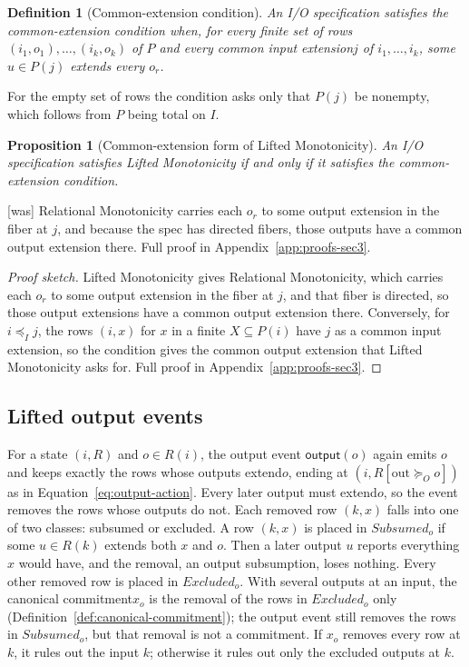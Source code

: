 \documentclass[sigconf]{cidr-2027}
\newtheorem{proposition}{Proposition}
\newtheorem{definition}{Definition}
\theoremstyle{remark}
\newcommand{\InputOrd}{\preceq_I}
\newcommand{\OutputGe}{\succeq_O}
\newcommand{\commitment}{commitment\xspace}
\newcommand{\indesc}{input extension\xspace} %
\newcommand{\outrel}{extends\xspace}          %
\newcommand{\outrelbase}{extend\xspace}       %
\newcommand{\outnoun}{output extension\xspace}%
\newcommand{\outnouns}{output extensions\xspace}
\newcommand{\spectype}[1][]{I/O specification#1\xspace}
\newcommand{\fiber}[1]{P(#1)}
\newcommand{\Subsumed}{\mathit{Subsumed}}
\newcommand{\Excluded}{\mathit{Excluded}}
\begin{document}
\begin{definition}[Common-extension condition]
\label{def:common-expansion-condition}
An \spectype satisfies the \emph{common-extension condition} when,
for every finite set of rows $(i_1,o_1),\ldots,(i_k,o_k)$ of $P$ and every
common \indesc $j$ of $i_1,\ldots,i_k$, some $u\in P(j)$ \outrel every
$o_r$.
\end{definition}

For the empty set of rows the condition asks only that $P(j)$ be nonempty, which
follows from $P$ being total on $I$.

\begin{proposition}[Common-extension form of Lifted Monotonicity]
\label{prop:common-expansion-form}
An \spectype satisfies Lifted Monotonicity if and only
if it satisfies the common-extension condition.
\end{proposition}



{\footnotesize\color{black!50}\noindent\textsf{[was]} Relational Monotonicity carries each $o_r$ to some
\outnoun in the fiber at $j$, and because the spec has directed
fibers, those outputs have a common \outnoun there.  Full proof in Appendix~\ref{app:proofs-sec3}.\par}

\color{blue!70!black}\begin{proof}[Proof sketch]
Lifted Monotonicity gives Relational Monotonicity, which carries each $o_r$
to some \outnoun in the fiber at $j$, and that fiber is directed, so those
\outnouns have a common \outnoun there.  Conversely, for $i\InputOrd j$, the
rows $(i,x)$ for $x$ in a finite $X\subseteq\fiber{i}$ have $j$ as a common
\indesc, so the condition gives the common \outnoun that Lifted Monotonicity
asks for.  Full proof in Appendix~\ref{app:proofs-sec3}.\color{black}
\end{proof}

\subsection{Lifted output events}
\label{sec:lifted-output-events}

For a state $(i,R)$ and $o\in R(i)$, the output event $\mathsf{output}(o)$
again emits $o$ and keeps exactly the rows whose outputs \outrelbase $o$,
ending at $(i,R[\mathrm{out}\OutputGe o])$ as in Equation~\ref{eq:output-action}.
Every later output must \outrelbase $o$, so the event removes the rows whose
outputs do not.  Each removed row $(k,x)$ falls into one of two classes:
subsumed or excluded.  A row $(k,x)$ is placed in $\Subsumed_o$ if some
$u\in R(k)$ \outrel both $x$ and $o$.  Then a later output $u$ reports
everything $x$ would have, and the removal, an output subsumption, loses
nothing.  Every other removed row is placed in $\Excluded_o$.  With several
outputs at an input, the canonical \commitment $x_o$ is the removal of the rows
in $\Excluded_o$ only (Definition~\ref{def:canonical-commitment}); the output
event still removes the rows in $\Subsumed_o$, but that removal is not a
\commitment.  If $x_o$ removes every row at $k$, it rules out the input $k$;
otherwise it rules out only the excluded outputs at $k$.
\end{document}
